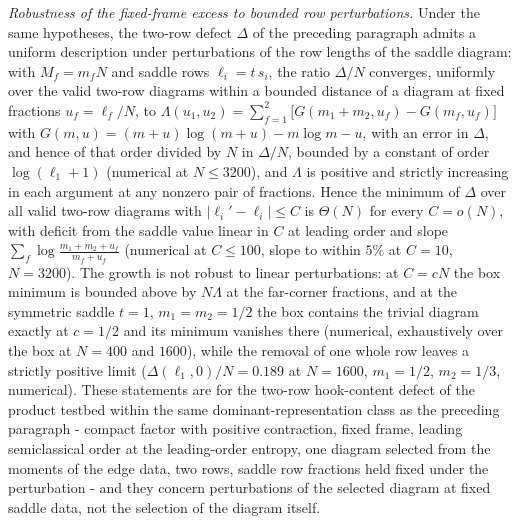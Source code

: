 \emph{Robustness of the fixed-frame excess to bounded row perturbations.} Under the same hypotheses, the two-row defect \(\Delta\) of the preceding paragraph admits a uniform description under perturbations of the row lengths of the saddle diagram: with \(M_f=m_fN\) and saddle rows \(\ell_i=t\,s_i\), the ratio \(\Delta/N\) converges, uniformly over the valid two-row diagrams within a bounded distance of a diagram at fixed fractions \(u_f=\ell_f/N\), to \(\Lambda(u_1,u_2)=\sum_{f=1}^2\bigl[G(m_1+m_2,u_f)-G(m_f,u_f)\bigr]\) with \(G(m,u)=(m+u)\log(m+u)-m\log m-u\), with an error in \(\Delta\), and hence of that order divided by \(N\) in \(\Delta/N\), bounded by a constant of order \(\log(\ell_1+1)\) (numerical at \(N\le3200\)), and \(\Lambda\) is positive and strictly increasing in each argument at any nonzero pair of fractions. Hence the minimum of \(\Delta\) over all valid two-row diagrams with \(|\ell_i'-\ell_i|\le C\) is \(\Theta(N)\) for every \(C=o(N)\), with deficit from the saddle value linear in \(C\) at leading order and slope \(\sum_f\log\frac{m_1+m_2+u_f}{m_f+u_f}\) (numerical at \(C\le100\), slope to within \(5\%\) at \(C=10\), \(N=3200\)). The growth is not robust to linear perturbations: at \(C=cN\) the box minimum is bounded above by \(N\Lambda\) at the far-corner fractions, and at the symmetric saddle \(t=1\), \(m_1=m_2=1/2\) the box contains the trivial diagram exactly at \(c=1/2\) and its minimum vanishes there (numerical, exhaustively over the box at \(N=400\) and \(1600\)), while the removal of one whole row leaves a strictly positive limit (\(\Delta(\ell_1,0)/N=0.189\) at \(N=1600\), \(m_1=1/2\), \(m_2=1/3\), numerical). These statements are for the two-row hook-content defect of the product testbed within the same dominant-representation class as the preceding paragraph - compact factor with positive contraction, fixed frame, leading semiclassical order at the leading-order entropy, one diagram selected from the moments of the edge data, two rows, saddle row fractions held fixed under the perturbation - and they concern perturbations of the selected diagram at fixed saddle data, not the selection of the diagram itself.

